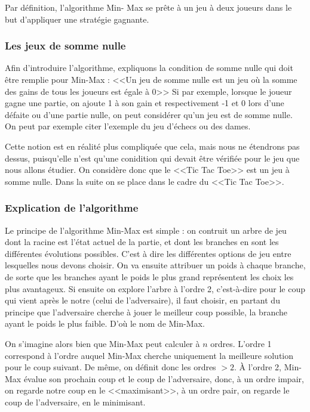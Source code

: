 \documentclass{article}
\begin{document}
Par définition, l'algorithme Min-
Max se prête à un jeu à deux joueurs dans le but d'appliquer une stratégie
gagnante.

\subsubsection{Les jeux de somme nulle}
Afin d'introduire l'algorithme, expliquons la condition de somme nulle qui
doit être remplie pour Min-Max : <<Un jeu de somme nulle est un jeu où la somme des gains de tous les joueurs est égale à 0>>
Si par exemple, lorsque le joueur gagne une partie, on ajoute 1 à son gain et respectivement -1 et 0 lors d'une défaite ou d'une partie nulle, on peut considérer qu'un jeu est de somme nulle.
On peut par exemple citer l'exemple du jeu d'échecs ou des dames. 

Cette notion est en réalité plus compliquée que cela, mais nous ne étendrons pas dessus, puisqu'elle n'est qu'une conidition qui devait être vérifiée
pour le jeu que nous allons étudier. 
On considère donc que le <<Tic Tac Toe>> est un jeu à somme nulle.
Dans la suite on se place dans le cadre du <<Tic Tac Toe>>. 


\subsubsection{Explication de l'algorithme}

Le principe de l'algorithme Min-Max est simple : on contruit un arbre de jeu dont la racine est l'état actuel de la partie, 
et dont les branches en sont les différentes évolutions possibles. C'est à dire les différentes options de jeu entre lesquelles nous devons choisir.
On va ensuite attribuer un poids à chaque branche, de sorte que les branches ayant le poids le plus grand représentent les choix les plus avantageux.
Si ensuite on explore l'arbre à l'ordre 2, c'est-à-dire pour le coup qui vient après le notre (celui de l'adversaire), il faut choisir, en partant du principe que 
l'adversaire cherche à jouer le meilleur coup possible, la branche ayant le poids le plus faible. D'où le nom de Min-Max.



On s'imagine alors bien que Min-Max peut calculer à $n$ ordres. L'ordre 1
correspond à l'ordre auquel Min-Max cherche uniquement la meilleure solution pour le coup suivant. 
De même, on définit donc les ordres $>2$.
À l'ordre 2, Min-Max évalue son prochain coup et le coup de l'adversaire, donc, à un ordre impair, on regarde notre coup en le <<maximisant>>, à un ordre pair, on regarde le coup de l'adversaire, en le minimisant.
\end{document}
